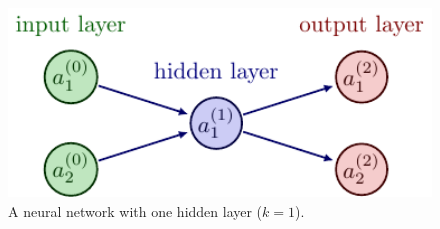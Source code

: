 \documentclass[11pt]{article}
\begin{document}
\begin{figure}[t]
    \centering
    \begin{minipage}{0.59\linewidth}
        \includegraphics[width=1\textwidth]{./figures/neural_nets/MLP_2.pdf}
    \end{minipage}%
    \hfill
    \begin{minipage}{0.4\linewidth}
        \caption{A neural network with one hidden layer ($k=1$).}
        \label{fig:neural_nets_simple_example}
    \end{minipage}
\end{figure}
\end{document}
